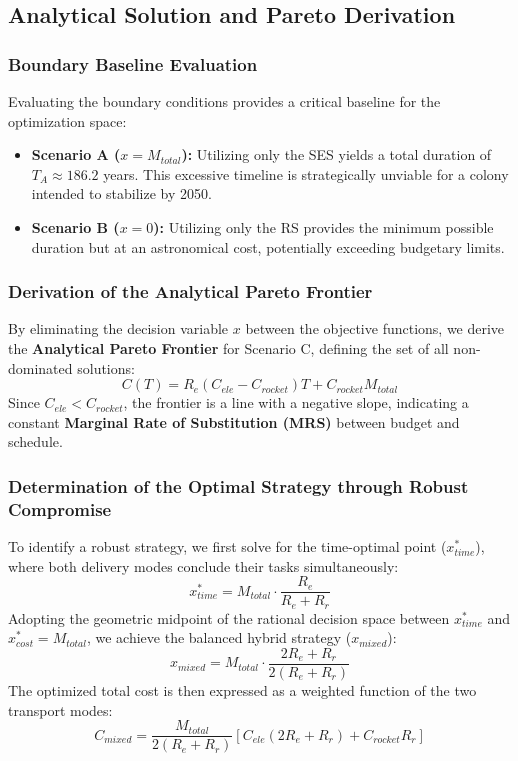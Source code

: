 \documentclass{mcmthesis}
\begin{document}
	\subsection{Analytical Solution and Pareto Derivation}
	
	\subsubsection{Boundary Baseline Evaluation}
	Evaluating the boundary conditions provides a critical baseline for the optimization space:
	\begin{itemize}
		\item \textbf{Scenario A ($x=M_{total}$):} Utilizing only the SES yields a total duration of $T_A \approx 186.2$ years. This excessive timeline is strategically unviable for a colony intended to stabilize by 2050.
		\item \textbf{Scenario B ($x=0$):} Utilizing only the RS provides the minimum possible duration but at an astronomical cost, potentially exceeding budgetary limits.
	\end{itemize}
	
	\subsubsection{Derivation of the Analytical Pareto Frontier}
	By eliminating the decision variable $x$ between the objective functions, we derive the \textbf{Analytical Pareto Frontier} for Scenario C, defining the set of all non-dominated solutions:
	\begin{equation}
		C(T) = R_e(C_{ele} - C_{rocket})T + C_{rocket} M_{total}
	\end{equation}
	Since $C_{ele} < C_{rocket}$, the frontier is a line with a negative slope, indicating a constant \textbf{Marginal Rate of Substitution (MRS)} between budget and schedule.
	
	\subsubsection{Determination of the Optimal Strategy through Robust Compromise}
	To identify a robust strategy, we first solve for the time-optimal point ($x_{time}^*$), where both delivery modes conclude their tasks simultaneously:
	\begin{equation}
		x_{time}^* = M_{total} \cdot \frac{R_e}{R_e + R_r}
	\end{equation}
	Adopting the geometric midpoint of the rational decision space between $x_{time}^*$ and $x_{cost}^* = M_{total}$, we achieve the balanced hybrid strategy ($x_{mixed}$):
	\begin{equation}
		x_{mixed} = M_{total} \cdot \frac{2R_e + R_r}{2(R_e + R_r)}
	\end{equation}
	The optimized total cost is then expressed as a weighted function of the two transport modes:
	\begin{equation}
		C_{mixed} = \frac{M_{total}}{2(R_e + R_r)} \left[ C_{ele}(2R_e + R_r) + C_{rocket} R_r \right]
	\end{equation}
\end{document}

